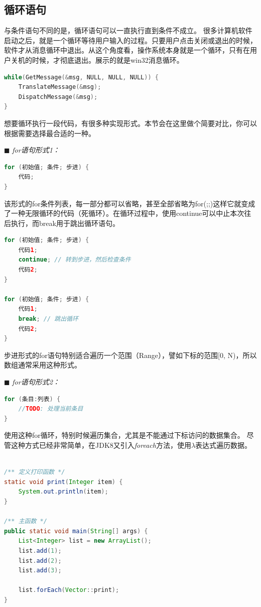 \subsection{循环语句}
与条件语句不同的是，循环语句可以一直执行直到条件不成立。
很多计算机软件启动之后，就是一个循环等待用户输入的过程。只要用户点击关闭或退出的时候，软件才从消息循环中退出。从这个角度看，操作系统本身就是一个循环，只有在用户关机的时候，才彻底退出。展示的就是win32消息循环。
\begin{lstlisting}[language=C++, caption={消息循环},label=code:part1_win_loop]
while(GetMessage(&msg, NULL, NULL, NULL)) {
    TranslateMessage(&msg);
    DispatchMessage(&msg);
}
\end{lstlisting}


想要循环执行一段代码，有很多种实现形式。本节会在这里做个简要对比，你可以根据需要选择最合适的一种。


\noindent $\blacksquare$ \emph{for语句形式1：}
\begin{lstlisting}[language=Java, caption={for循环：步进形式},label=code:part1_for_next]
for (初始值; 条件; 步进) {
    代码;
}
\end{lstlisting}
该形式的for条件列表，每一部分都可以省略，甚至全部省略为for(;;)这样它就变成了一种无限循环的代码（死循环）。在循环过程中，使用continue可以中止本次往后执行，而break用于跳出循环语句。
\begin{lstlisting}[language=Java]
for (初始值; 条件; 步进) {
    代码1;
    continue; // 转到步进，然后检查条件
    代码2;
}

for (初始值; 条件; 步进) {
    代码1;
    break; // 跳出循环
    代码2;
}
\end{lstlisting}

步进形式的for语句特别适合遍历一个范围（Range），譬如下标的范围[0, N)，所以数组通常采用这种形式。
\vspace{0.3cm}

\noindent $\blacksquare$ \emph{for语句形式2：}
\begin{lstlisting}[language=Java]
for (条目:列表) {
    //TODO: 处理当前条目
}
\end{lstlisting}
使用这种for循环，特别时候遍历集合，尤其是不能通过下标访问的数据集合。
尽管这种方式已经非常简单，在JDK8又引入\emph{foreach}方法，使用$\lambda$表达式遍历数据。
\begin{lstlisting}[language=Java]

/** 定义打印函数 */
static void print(Integer item) {
    System.out.println(item);
}

/** 主函数 */
public static void main(String[] args) {
    List<Integer> list = new ArrayList();
    list.add(1);
    list.add(2);
    list.add(3);

    list.forEach(Vector::print);
}
\end{lstlisting}

